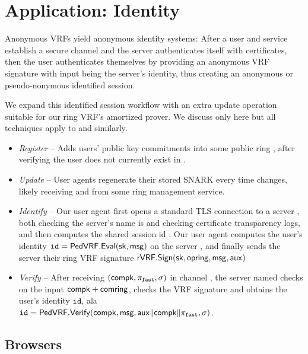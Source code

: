 \section{Application: Identity}
\label{sec:app_identity}

Anonymous VRFs yield anonymous identity systems:
After a user and service establish a secure channel and
the server authenticates itself with certificates, then
the user authenticates themselves by providing an anonymous
VRF signature with input \msg being the server's identity,
thus creating an anonymous or pseudo-nonymous identified session.

We expand this identified session workflow with an extra
update operation suitable for our ring VRF's amortized prover.
We discuss only \pifast here but all techniques apply to \pisk and \pipk similarly. 

\begin{itemize}
\item {\em Register} --
 Adds users' public key commitments into some public ring \ctx,
 after verifying the user does not currently exist in \ctx.
\item {\em Update} --
 User agents regenerate their stored SNARK \pifast every time \ctx changes,
 likely receiving \comring and \openring from some ring management service.
\item {\em Identify} --
 Our user agent first opens a standard TLS connection to a server \msg,
 both checking the server's name is \msg and checking certificate
 transparency logs, and then computes the shared session id \aux.
 Our user agent computes the user's identity
  $\mathtt{id} = {\mathsf{PedVRF}}.{\mathsf{Eval}}(\mathsf{sk},\mathsf{msg})$ on the server \msg,
 and finally sends the server their ring VRF signature
 ${\mathsf{rVRF}}.{\mathsf{Sign}}(\mathsf{sk},\mathsf{opring},\mathsf{msg},\mathsf{aux})$ %
\item {\em Verify} -- 
 After receiving $(\mathsf{compk},\pi_{\mathtt{fast}},\sigma)$ in channel \aux,
 the server named \msg checks \pifast on the input $\mathsf{compk} + \mathsf{comring}$,
 checks the VRF signature and obtains the user's identity $\mathtt{id}$, ala \\
 $\mathtt{id} = {\mathsf{PedVRF}}.{\mathsf{Verify}}(\mathsf{compk},\mathsf{msg},\mathsf{aux} \| \mathsf{compk} \| \pi_{\mathtt{fast}},\sigma)$.
\end{itemize}


\subsection{Browsers}


